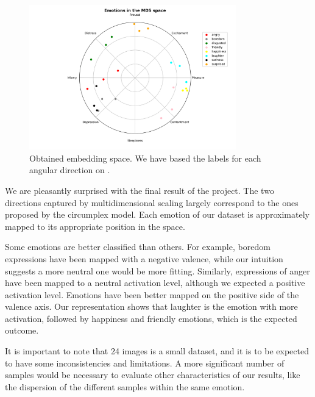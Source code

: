 \documentclass[11pt, a4paper]{article}
\numberwithin{equation}{subsection}
\begin{document}
\begin{figure}[h]
    \centering
    \includegraphics[width=0.8\textwidth]{images/circumplex_model_plot.png}
    \caption{Obtained embedding space. We have based the labels for each angular direction on \cite{posner-2005}.}
    \label{fig:circumplex_fig}
\end{figure}

We are pleasantly surprised with the final result of the project. The two directions captured by multidimensional scaling largely correspond to the ones proposed by the circumplex model. Each emotion of our dataset is approximately mapped to its appropriate position in the space.

Some emotions are better classified than others. For example, boredom expressions have been mapped with a negative valence, while our intuition suggests a more neutral one would be more fitting. Similarly, expressions of anger have been mapped to a neutral activation level, although we expected a positive activation level. Emotions have been better mapped on the positive side of the valence axis. Our representation shows that laughter is the emotion with more activation, followed by happiness and friendly emotions, which is the expected outcome.

It is important to note that 24 images is a small dataset, and it is to be expected to have some inconsistencies and limitations. A more significant number of samples would be necessary to evaluate other characteristics of our results, like the dispersion of the different samples within the same emotion.

\newpage


\end{document}
